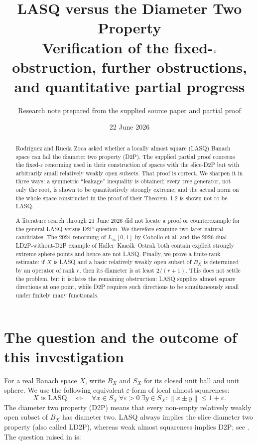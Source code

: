 \documentclass[11pt]{article}
\title{LASQ versus the Diameter Two Property\\
\large Verification of the fixed-$\eps$ obstruction, further obstructions, and quantitative partial progress}
\author{Research note prepared from the supplied source paper and partial proof}
\date{22 June 2026}
\newcommand{\eps}{\varepsilon}
\newcommand{\norm}[1]{\left\lVert #1\right\rVert}
\begin{document}
\maketitle

\begin{abstract}
Rodr\'iguez and Rueda Zoca asked whether a locally almost square (LASQ) Banach space can fail the diameter two property (D2P).  The supplied partial proof concerns the fixed-$\eps$ renorming used in their construction of spaces with the slice-D2P but with arbitrarily small relatively weakly open subsets.  That proof is correct.  We sharpen it in three ways: a symmetric ``leakage'' inequality is obtained; every tree generator, not only the root, is shown to be quantitatively strongly extreme; and the actual norm on the whole space constructed in the proof of their Theorem~1.2 is shown not to be LASQ.

A literature search through 21 June 2026 did not locate a proof or counterexample for the general LASQ-versus-D2P question.  We therefore examine two later natural candidates.  The 2024 renorming of $L_\infty[0,1]$ by Cobollo et al. and the 2026 dual LD2P-without-D2P example of Haller--Kaasik--Ostrak both contain explicit strongly extreme sphere points and hence are not LASQ.  Finally, we prove a finite-rank estimate: if $X$ is LASQ and a basic relatively weakly open subset of $B_X$ is determined by an operator of rank $r$, then its diameter is at least $2/(r+1)$.  This does not settle the problem, but it isolates the remaining obstruction: LASQ supplies almost square directions at one point, while D2P requires such directions to be simultaneously small under finitely many functionals.
\end{abstract}

\tableofcontents

\section{The question and the outcome of this investigation}

For a real Banach space $X$, write $B_X$ and $S_X$ for its closed unit ball and unit sphere.  We use the following equivalent $\eps$-form of local almost squareness:
\[
 X \text{ is LASQ}
 \quad\Longleftrightarrow\quad
 \forall x\in S_X\ \forall\eps>0\ \exists y\in S_X:
 \norm{x\pm y}\le 1+\eps.
\]
The diameter two property (D2P) means that every non-empty relatively weakly open subset of $B_X$ has diameter two.  LASQ always implies the slice diameter two property (also called LD2P), whereas weak almost squareness implies D2P; see \cite{ALL2016}.  The question raised in \cite{RodriguezRueda2023} is:
\end{document}
